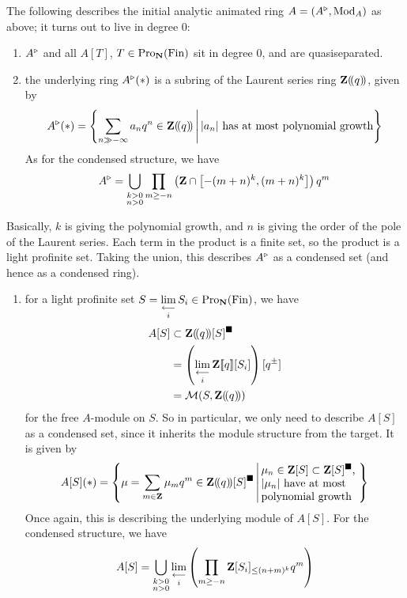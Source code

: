 \begin{theorem}
  The following describes the initial analytic animated ring $A=(A^\triangleright,\operatorname{Mod}_A)$ as above; it turns out to live in degree 0:
  \begin{enumerate}
    \item $A^\triangleright$ and all $A[T]$, $T\in\operatorname{Pro}_\mathbf N(\operatorname{Fin})$ sit in degree 0, and are quasiseparated.

    \item the underlying ring $A^\triangleright(*)$ is a subring of the Laurent series ring $\mathbf Z(\!(q)\!)$, given by
    \[
      A^\triangleright(*) =
      \left\{
        \sum_{n\gg-\infty} a_n q^n
        \in \mathbf Z(\!(q)\!)
        \,\middle|\,
        |a_n| \text{ has at most polynomial growth}
      \right\}
    \]
    As for the condensed structure, we have
    \[
      A^\triangleright
      =
      \bigcup_{\substack{k>0\\n>0}}
      \prod_{m\ge-n}
      \left(
        \mathbf Z\cap
        \left[
          -(m+n)^k, (m+n)^k
        \right]
      \right)
      q^m
    \]
  \end{enumerate}
  {\normalfont Basically, $k$ is giving the polynomial growth, and $n$ is giving the order of the pole of the Laurent series. Each term in the product is a finite set, so the product is a light profinite set. Taking the union, this describes $A^\triangleright$ as a condensed set (and hence as a condensed ring).}
  \begin{enumerate}
  \setcounter{enumi}2
    \item for a light profinite set $S=\mathop{\operatorname*{lim}\limits_{\longleftarrow}}\limits_i S_i\in\operatorname{Pro}_\mathbf N(\operatorname{Fin})$, we have
    \begin{align*}
      A[S]
        &\subset \mathbf Z(\!(q)\!)[S]^\blacksquare\\
        &= \left(\mathop{\operatorname*{lim}\limits_{\longleftarrow}}\limits_i \mathbf Z[\![q]\!][S_i]\right)[q^\pm]\\
        &= \mathcal M(S,\mathbf Z(\!(q)\!))
    \end{align*}
    for the free $A$-module on $S$. So in particular, we only need to describe $A[S]$ as a condensed set, since it inherits the module structure from the target. It is given by
    \[
      A[S](*) =
      \left\{
        \mu = \sum_{m\in\Z} \mu_m q^m \in \Z\lsr q[S]^\solid
        \,\middle|\,
        \parbox[c]{3.1cm}{\raggedright $\mu_n\in\Z[S]\subset\Z[S]^\solid$,\\$|\mu_n|$ have at most polynomial growth}
      \right\}
    \]
    Once again, this is describing the underlying module of $A[S]$. For the condensed structure, we have
    \[
      A[S]
      =
      \bigcup_{\substack{k>0\\n>0}}
      \mathop{\operatorname*{lim}\limits_{\longleftarrow}}\limits_i
      \left(
      \prod_{m\ge-n}
        \mathbf Z[S_i]_{\le(n+m)^k}
        q^m
      \right)
    \]
  \end{enumerate}
\end{theorem}

